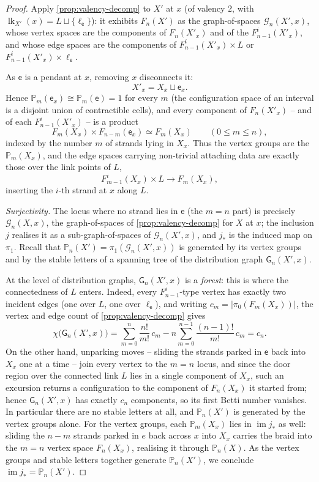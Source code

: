 \documentclass[reqno]{amsart}
\theoremstyle{definition}
\newcommand\cG{\mathcal{G}}
\newcommand\sfG{\mathsf{G}}
\newcommand\sfe{\mathsf{e}}
\newcommand{\PB}{\mathbb{P}}
\newcommand{\im}{\operatorname{im}}
\DeclareMathOperator{\lk}{lk}
\numberwithin{equation}{section}
\begin{document}
\begin{proof}
Apply \cref{prop:valency-decomp} to \(X'\) at \(x\) (of valency
\(2\), with \(\lk_{X'}(x)=L\sqcup\{\ell_\sfe\}\)): it
exhibits \(F_n(X')\) as the graph-of-spaces \(\cG_n(X',x)\), whose
vertex spaces are the components of \(F_n(X'_x)\) and of the
\(F^i_{n-1}(X'_x)\), and whose edge spaces are the components of
\(F^i_{n-1}(X'_x)\times L\) or \(F^i_{n-1}(X'_x)\times \ell_\sfe\).

As \(\sfe\) is a pendant at \(x\), removing \(x\) disconnects it:
\[
X'_x = X_x\sqcup\sfe_x.
\]
Hence \(\PB_m(\sfe_x)\cong\PB_m(\sfe)=1\) for every \(m\) (the configuration space of an
interval is a disjoint union of contractible cells), and every
component of \(F_n(X'_x)\) -- and of each \(F^i_{n-1}(X'_x)\) --
is a product
\[
F_m(X_x)\times F_{n-m}(\sfe_x)\simeq F_m(X_x)
\qquad(0\le m\le n),
\]
indexed by the number \(m\) of strands lying in \(X_x\). Thus the
vertex groups are the \(\PB_m(X_x)\), and the edge spaces carrying
non-trivial attaching data are exactly those over the link points
of \(L\),
\[
F^i_{m-1}(X_x)\times L \longrightarrow F_m(X_x),
\]
inserting the \(i\)-th strand at \(x\) along \(L\).

\emph{Surjectivity.} The locus where no strand lies in \(\sfe\) (the
\(m=n\) part) is precisely \(\cG_n(X,x)\), the graph-of-spaces of
\cref{prop:valency-decomp} for \(X\) at \(x\); the inclusion
\(j\) realises it as a sub-graph-of-spaces of \(\cG_n(X',x)\),
and \(j_\ast\) is the induced map on \(\pi_1\). Recall that
\(\PB_n(X')=\pi_1(\cG_n(X',x))\) is generated by its vertex groups
and by the stable letters of a spanning tree of the distribution
graph \(\sfG_n(X',x)\).

At the level of distribution graphs, \(\sfG_n(X',x)\) is a
\emph{forest}: this is where the connectedness of \(L\) enters.
Indeed, every \(F^i_{n-1}\)-type vertex has exactly two incident
edges (one over \(L\), one over \(\ell_\sfe\)), and writing
\(c_m=\bigl|\pi_0(F_m(X_x))\bigr|\), the vertex and edge count of
\cref{prop:valency-decomp} gives
\[
\chi\bigl(\sfG_n(X',x)\bigr)
=\sum_{m=0}^{n}\frac{n!}{m!}\,c_m
-n\sum_{m=0}^{n-1}\frac{(n-1)!}{m!}\,c_m
=c_n .
\]
On the other hand, unparking moves -- sliding the strands parked
in \(\sfe\) back into \(X_x\) one at a time -- join every vertex to
the \(m=n\) locus, and since the door region over the connected
link \(L\) lies in a single component of \(X_x\), such an
excursion returns a configuration to the component of
\(F_n(X_x)\) it started from; hence \(\sfG_n(X',x)\) has exactly
\(c_n\) components, so its first Betti number vanishes. In
particular there are no stable letters at all, and \(\PB_n(X')\)
is generated by the vertex groups alone. For the vertex
groups, each \(\PB_m(X_x)\) lies in \(\im j_\ast\) as well: sliding
the \(n-m\) strands parked in \(e\) back across \(x\) into \(X_x\)
carries the braid into the \(m=n\) vertex space \(F_n(X_x)\),
realising it through \(\PB_n(X)\). As the vertex groups and stable
letters together generate \(\PB_n(X')\), we conclude
\(\im j_\ast=\PB_n(X')\).


\end{proof}
\end{document}
